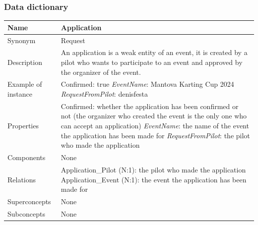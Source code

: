 \documentclass{beamer}
\begin{document}
\begin{frame}
\frametitle{Data dictionary}
\begin{table}
\tiny
\begin{tabular}{|p{2cm}|p{6cm}|}
\hline
Name & \textbf{Application} \\
\hline
Synonym & Request \\
\hline
Description & An application is a weak entity of an event, it is created
by a pilot who wants to participate to an event and approved by the organizer
of the event. \\
\hline
Example of instance &
Confirmed: true \newline
\textit{EventName}: Mantova Karting Cup 2024 \newline
\textit{RequestFromPilot}: denisfesta \\
\hline
Properties &
Confirmed: whether the application has been confirmed or not (the organizer who
created the event is the
only one who can accept an application) \newline
\textit{EventName}: the name of the event the application has been made for \newline
\textit{RequestFromPilot}: the pilot who made the application \\
\hline
Components & None \\
\hline
Relations &
Application\_Pilot (N:1): the pilot who made the application \newline
Application\_Event (N:1): the event the application has been made for \\
\hline
Superconcepts & None \\
\hline
Subconcepts & None \\
\hline
\end{tabular}
\end{table}
\end{frame}
\end{document}
